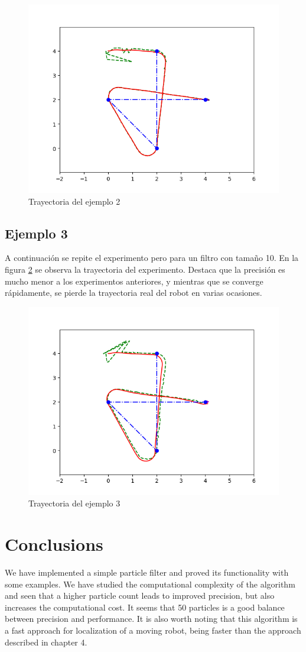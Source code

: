 \begin{figure}[htb]
  \centering
  \includegraphics[width=.8\linewidth]{images/filtro9.png}
  \caption{Trayectoria del ejemplo 2}
  \label{fig:ejemplo9}
\end{figure}
\subsection{Ejemplo 3}
A continuación se repite el experimento pero para un filtro con tamaño 10.
En la figura \ref{fig:ejemplo10} se observa la trayectoria del experimento. Destaca que la precisión es mucho menor a los experimentos anteriores, y mientras que se converge rápidamente, 
se pierde la trayectoria real del robot en varias ocasiones.
\begin{figure}[htb]
  \centering
  \includegraphics[width=.8\linewidth]{images/filtro10.png}
  \caption{Trayectoria del ejemplo 3}
  \label{fig:ejemplo10}
\end{figure}
\section{Conclusions}
We have implemented a simple particle filter and proved its functionality with some examples. We have studied the computational complexity of the algorithm and seen that
a higher particle count leads to improved precision, but also increases the computational cost. It seems that 50 particles is a good balance between precision and performance.
It is also worth noting that this algorithm is a fast approach for localization of a moving robot, being faster than the approach described in chapter 4.

